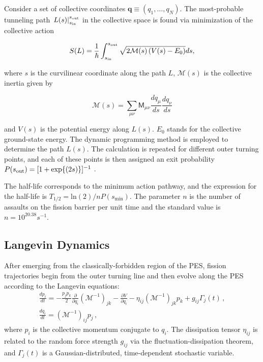 Consider a set of collective coordinates $\mathbf{q}\equiv(q_1, \ldots, q_N)$. The most-probable tunneling path $\left. L(s) \right|_{s_{\rm in}}^{s_{\rm out}}$ in the collective space is found via minimization of the collective action

\begin{equation}\label{eq:action} 
S(L) = \frac{1}{\hbar}\int_{s_{\rm in}}^{s_{\rm out}} \sqrt{2\mathcal{M}(s)\left(V(s)-E_0\right)}ds,
\end{equation} 

\noindent where $s$ is the curvilinear coordinate along the path $L$,
$\mathcal{M}(s)$ is the collective inertia given by \cite{Sadhukhan2013}

\begin{equation}
\mathcal{M}(s) = \sum_{\mu\nu} \mathsf{M}_{\mu\nu} \frac{dq_\mu}{ds} \frac{dq_\nu}{ds}
\end{equation}

\noindent and $V(s)$ is the potential energy along $L(s)$. $E_0$ stands for the collective ground-state
energy. The dynamic programming method \cite{Baran1981} is employed to determine
the path $L(s)$. The calculation is repeated for different outer turning points,
and each of these points is then assigned an exit  probability $P(s_{\rm out})=[1+\exp{(2s)}]^{-1}$ \cite{Baran1978}. 

The half-life corresponds to the minimum action pathway, and the expression for the half-life is $T_{1/2} = \mathrm{ln}(2)/nP(s_\mathrm{min})$. The parameter $n$ is the number of assaults on the fission barrier per unit time and the standard value is $n=10^{20.38} s^{-1}$.

\subsection{Langevin Dynamics}

After emerging from the classically-forbidden region of the PES, fission trajectories begin from the outer turning
line and then evolve along the PES according to the Langevin equations:
\begin{gather} 
	\frac{dp_i}{dt} =  
	-\frac{p_j p_k}{2} \frac{\partial}{\partial q_i}\left(\mathcal{M}^{-1}\right)_{jk} 
	- \frac{\partial V}{\partial q_i}  - \eta_{ij}\left(\mathcal{M}^{-1}\right)_{jk} p_k + g_{ij}\Gamma_j(t) \,, \\ 
	\frac{dq_i}{dt} = 	\left(\mathcal{M}^{-1}\right)_{ij} p_j \,,  
\end{gather} 
where $p_i$ is the collective momentum conjugate to $q_i$. The dissipation
tensor $\eta_{ij}$ is related to the random force strength $g_{ij}$ via the
fluctuation-dissipation theorem, and $\Gamma_j(t)$ is a Gaussian-distributed,
time-dependent stochastic variable.

